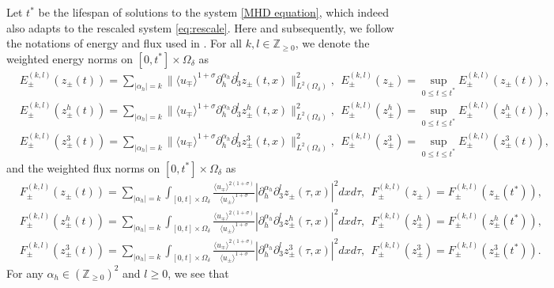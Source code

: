 \documentclass[10pt,reqno]{amsart}
\numberwithin{equation}{section}
\begin{document}
 
Let $t^*$ be the lifespan of solutions to the system \eqref{MHD equation}, which indeed also adapts to the rescaled system \eqref{eq:rescale}. Here and subsequently, 
we follow the notations of energy  and flux used in \cite{Xu}. For all $k,l\in\mathbb{Z}_{\geqslant 0}$, we denote the weighted energy norms on $[0,t^*]\times\Omega_\delta$ as  
\begin{align*}
	&E^{(k,l)}_{\pm}(z_\pm(t))=
	\sum_{|\alpha_h|=k}\big\|\langle u_\mp\rangle^{1+\sigma}\partial_h^{\alpha_h}\partial_3^lz_{\pm}(t,x)\big\|_{L^2(\Omega_{\delta})}^2,\ \ E^{(k,l)}_{\pm}(z_\pm)=\sup_{0\leqslant t\leqslant t^*}E^{(k,l)}_{\pm}(z_\pm(t)),\\
	&E^{(k,l)}_{\pm}(z_\pm^h(t))=
	\sum_{|\alpha_h|=k}\big\|\langle u_\mp\rangle^{1+\sigma}\partial_h^{\alpha_h}\partial_3^lz_{\pm}^h(t,x)\big\|_{L^2(\Omega_{\delta})}^2,\ \ E^{(k,l)}_{\pm}(z_\pm^h)=\sup_{0\leqslant t\leqslant t^*}E^{(k,l)}_{\pm}(z_\pm^h(t)),\\
	&E^{(k,l)}_{\pm}(z_\pm^3(t))=
	\sum_{|\alpha_h|=k}\big\|\langle u_\mp\rangle^{1+\sigma}\partial_h^{\alpha_h}\partial_3^lz_{\pm}^3(t,x)\big\|_{L^2(\Omega_{\delta})}^2,\ \ E^{(k,l)}_{\pm}(z_\pm^3)=\sup_{0\leqslant t\leqslant t^*}E^{(k,l)}_{\pm}(z_\pm^3(t)),
\end{align*}
and the weighted flux norms on $[0,t^*]\times\Omega_\delta$  as 
\begin{align*}
	&F^{(k,l)}_{\pm}(z_\pm(t))=\sum_{|\alpha_h|=k}\int_{[0,t]\times\Omega_\delta}\frac{\langle u_{\mp}\rangle^{2(1+\sigma)}}{\langle u_{\pm}\rangle^{1+\sigma}}|\partial_h^{\alpha_h}\partial_3^lz_{\pm}(\tau,x)|^2dxd\tau,\ \ F^{(k,l)}_{\pm}(z_\pm)=F^{(k,l)}_{\pm}(z_\pm(t^*)),\\
	&F^{(k,l)}_{\pm}(z_\pm^h(t))=\sum_{|\alpha_h|=k}\int_{[0,t]\times\Omega_\delta}\frac{\langle u_{\mp}\rangle^{2(1+\sigma)}}{\langle u_{\pm}\rangle^{1+\sigma}}|\partial_h^{\alpha_h}\partial_3^lz_{\pm}^h(\tau,x)|^2dxd\tau,\ \ F^{(k,l)}_{\pm}(z_\pm^h)=F^{(k,l)}_{\pm}(z_\pm^h(t^*)),\\
	&F^{(k,l)}_{\pm}(z_\pm^3(t))=\sum_{|\alpha_h|=k}\int_{[0,t]\times\Omega_\delta}\frac{\langle u_{\mp}\rangle^{2(1+\sigma)}}{\langle u_{\pm}\rangle^{1+\sigma}}|\partial_h^{\alpha_h}\partial_3^lz_{\pm}^3(\tau,x)|^2dxd\tau,\ \  F^{(k,l)}_{\pm}(z^3_\pm)=F^{(k,l)}_{\pm}(z^3_\pm(t^*)).
\end{align*}
	For any $\alpha_h\in(\mathbb{Z}_{\geqslant0})^2$ and $l\geqslant 0$, we see that  
\end{document}
